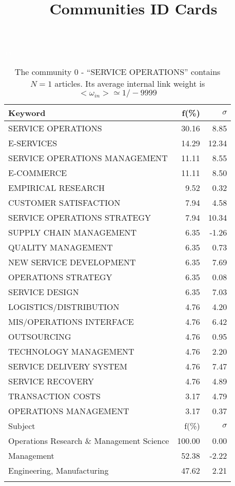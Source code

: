 \documentclass[a4paper,11pt]{report}
\title{{\bf Communities ID Cards}}
\date{\begin{flushleft}This document gather the ``ID Cards'' of the CC communities found within your database.\\
 The CC network was built by keeping a link between articles sharing at least 10 references. The communities characterized here correspond to the ones found in the level 0 (in the sense of the Louvain algo) which gathers more than 0 articles.\\
 These ID cards displays the most frequent keywords, subject categories, journals of publication, institution, countries, authors, references and reference journals of the articles of each community. The significance of an item $\sigma = \sqrt{N} (f - p) / \sqrt{p(1-p)}$ [where $N$ is the number of articles within the community and $f$ and $p$ are the proportion of articles respectively within the community and within the database displaying that item ] is also given (for example $\sigma > 5$ is really highly significant).\\
\vspace{1cm}
\copyright Sebastian Grauwin, Liu Weizhi - (2014) \end{flushleft}}
\begin{document}
\begin{landscape}
\maketitle
\clearpage

\begin{table}[!ht]
\caption{The community 0 - ``SERVICE OPERATIONS'' contains $N = 1$ articles. Its average internal link weight is $<\omega_{in}> \simeq 1/-9999$ }
\textcolor{white}{aa}\\
{\scriptsize\begin{tabular}{|l r r|}
\hline
Keyword & f(\%) & $\sigma$\\
\hline
SERVICE OPERATIONS & 30.16 & 8.85\\
E-SERVICES & 14.29 & 12.34\\
SERVICE OPERATIONS MANAGEMENT & 11.11 & 8.55\\
E-COMMERCE & 11.11 & 8.50\\
EMPIRICAL RESEARCH & 9.52 & 0.32\\
CUSTOMER SATISFACTION & 7.94 & 4.58\\
SERVICE OPERATIONS STRATEGY & 7.94 & 10.34\\
SUPPLY CHAIN MANAGEMENT & 6.35 & -1.26\\
QUALITY MANAGEMENT & 6.35 & 0.73\\
NEW SERVICE DEVELOPMENT & 6.35 & 7.69\\
OPERATIONS STRATEGY & 6.35 & 0.08\\
SERVICE DESIGN & 6.35 & 7.03\\
LOGISTICS/DISTRIBUTION & 4.76 & 4.20\\
MIS/OPERATIONS INTERFACE & 4.76 & 6.42\\
OUTSOURCING & 4.76 & 0.95\\
TECHNOLOGY MANAGEMENT & 4.76 & 2.20\\
SERVICE DELIVERY SYSTEM & 4.76 & 7.47\\
SERVICE RECOVERY & 4.76 & 4.89\\
TRANSACTION COSTS & 3.17 & 4.79\\
OPERATIONS MANAGEMENT & 3.17 & 0.37\\
\hline
\hline
Subject & f(\%) & $\sigma$\\
\hline
Operations Research \& Management Science & 100.00 & 0.00\\
Management & 52.38 & -2.22\\
Engineering, Manufacturing & 47.62 & 2.21\\
 &  & \\

\end{tabular}}
\end{table}
\end{landscape}
\end{document}
